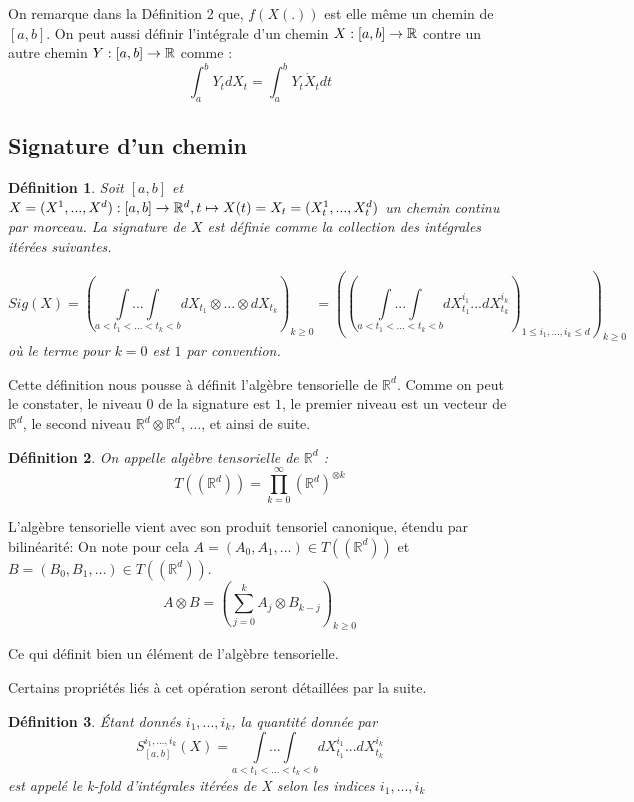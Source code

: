 \documentclass[10pt,a4paper]{article}
\newtheorem{definition}{Définition}
\begin{document}
On remarque dans la Définition 2 que, $f(X(.))$ est elle même un chemin de $[a, b]$. On peut aussi définir l'intégrale d'un chemin $X : [a,b] \rightarrow \mathbb{R}$ contre un autre chemin $Y : [a, b] \rightarrow \mathbb{R}$ comme :
\[ \int_a^b Y_t dX_t = \int_a^b Y_t \dot X_t dt \]

\subsection{Signature d'un chemin}

\begin{definition}
Soit $[a, b]$ et $X = (X^1, ..., X^d) : [a, b] \rightarrow \mathbb{R}^d, t \mapsto X(t) = X_t = (X_t^1, ..., X_t^d)$ un chemin continu par morceau. La signature de $X$ est définie comme la collection des intégrales itérées suivantes.

$$Sig(X) = \left( \underset{a<t_1<...<t_k<b}{\int ... \int } dX_{t_1} \otimes ... \otimes dX_{t_k}\right)_{k \geq 0} = \left( \left(\underset{a<t_1<...<t_k<b}{\int ... \int } dX_{t_1}^{i_1} ... dX_{t_k}^{i_k}\right)_{1 \leq i_1, ..., i_k \leq d} \right)_{k \geq 0}$$
où le terme pour $k=0$ est $1$ par convention.
\end{definition}

Cette définition nous pousse à définit l'algèbre tensorielle de  $\mathbb{R}^d$. Comme on peut le constater, le niveau 0 de la signature est $1$, le premier niveau est un vecteur de $\mathbb{R}^d$, le second niveau $\mathbb{R}^d \otimes \mathbb{R}^d$, ...,  et ainsi de suite.
\begin{definition}
On appelle algèbre tensorielle de $\mathbb{R}^d$ :
$$T((\mathbb{R}^d)) = \prod_{k=0}^{\infty} (\mathbb{R}^d)^{\otimes k}$$
\end{definition}

L'algèbre tensorielle vient avec son produit tensoriel canonique, étendu par bilinéarité: 
On note pour cela $A = (A_0, A_1, \ldots) \in T((\mathbb{R}^d))$ et $B = (B_0, B_1, \ldots) \in T((\mathbb{R}^d))$. \\


$$ A \otimes B = \left( \sum_{j=0}^k A_j \otimes B_{k-j} \right)_{k \geq 0}$$

Ce qui définit bien un élément de l'algèbre tensorielle.


Certains propriétés liés à cet opération seront détaillées par la suite.

\begin{definition}
Étant donnés $i_1, ..., i_k$, la quantité donnée par $$S_{[a, b]}^{i_1, ..., i_k}(X) = \underset{a<t_1<...<t_k<b} {\int ... \int} dX_{t_1}^{i_1} ... dX_{t_k}^{i_k}$$
est appelé le k-fold d'intégrales itérées de X selon les indices $i_1, ..., i_k$
\end{definition}
\end{document}
